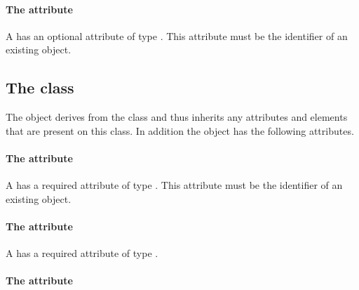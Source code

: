 \paragraph{The \fixttspace{} attribute}

A \BoundaryCondition has an optional attribute
 of type .
This attribute must be the identifier of an existing \DomainType object.


\subsection{The  class}
\label{diffusioncoefficient-class}




The \DiffusionCoefficient object derives from the \SBase class and thus
inherits any attributes and elements that are present on this class.
In addition the \DiffusionCoefficient object has the following
attributes.

\paragraph{The \fixttspace{} attribute}

A \DiffusionCoefficient has a required attribute  of
type .
This attribute must be the identifier of an existing \Species object.


\paragraph{The \fixttspace{} attribute}

A \DiffusionCoefficient has a required attribute  of type
.


\paragraph{The \fixttspace{} attribute}

